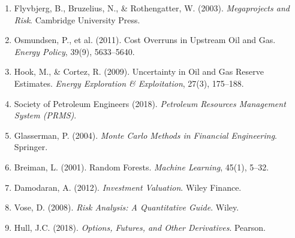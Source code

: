 \documentclass[12pt,a4paper]{article}
\begin{document}
\begin{enumerate}
\item Flyvbjerg, B., Bruzelius, N., \& Rothengatter, W. (2003). \textit{Megaprojects and Risk}. Cambridge University Press.
\item Osmundsen, P., et al. (2011). Cost Overruns in Upstream Oil and Gas. \textit{Energy Policy}, 39(9), 5633--5640.
\item Hook, M., \& Cortez, R. (2009). Uncertainty in Oil and Gas Reserve Estimates. \textit{Energy Exploration \& Exploitation}, 27(3), 175--188.
\item Society of Petroleum Engineers (2018). \textit{Petroleum Resources Management System (PRMS)}.
\item Glasserman, P. (2004). \textit{Monte Carlo Methods in Financial Engineering}. Springer.
\item Breiman, L. (2001). Random Forests. \textit{Machine Learning}, 45(1), 5--32.
\item Damodaran, A. (2012). \textit{Investment Valuation}. Wiley Finance.
\item Vose, D. (2008). \textit{Risk Analysis: A Quantitative Guide}. Wiley.
\item Hull, J.C. (2018). \textit{Options, Futures, and Other Derivatives}. Pearson.
\end{enumerate}
\end{document}
